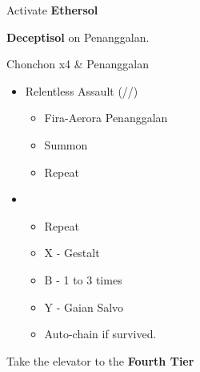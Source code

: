 \documentclass{report}
\begin{document}
Activate \textbf{Ethersol}

\textbf{Deceptisol} on Penanggalan.
\renewcommand{\second}{[2] Relentless Assault (\rav/\rav/\com)}
\renewcommand{\fourth}{[3] Mystic Tower (\rav/\rav/\sen)}

\begin{battle}{Chonchon x4 \& Penanggalan}
\begin{itemize}
    \item \second
    \begin{itemize}
        \item Fira-Aerora Penanggalan
        \item Summon
        \item Repeat
    \end{itemize}
    \item \third
    \begin{itemize}
        \item Repeat
        \item X - Gestalt
        \item B - 1 to 3 times
        \item Y - Gaian Salvo
        \item Auto-chain if survived.
    \end{itemize}
\end{itemize}
\end{battle}

Take the elevator to the \textbf{Fourth Tier}
\end{document}
